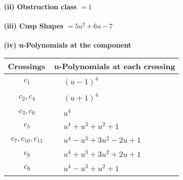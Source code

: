 \documentclass[1p]{elsarticle_modified}
\theoremstyle{definition}
\begin{document}
\flushleft \textbf{(ii) Obstruction class $= 1$}\\~\\
\flushleft \textbf{(iii) Cusp Shapes $= 5 u^2+6 u-7$}\\~\\
\newpage\renewcommand{\arraystretch}{1}
\flushleft \textbf{(iv) u-Polynomials at the component}\newline \\
\begin{tabular}{m{50pt}|m{274pt}}
Crossings & \hspace{64pt}u-Polynomials at each crossing \\
\hline $$\begin{aligned}c_{1}\end{aligned}$$&$\begin{aligned}
&(u-1)^4
\end{aligned}$\\
\hline $$\begin{aligned}c_{2},c_{4}\end{aligned}$$&$\begin{aligned}
&(u+1)^4
\end{aligned}$\\
\hline $$\begin{aligned}c_{3},c_{6}\end{aligned}$$&$\begin{aligned}
&u^4
\end{aligned}$\\
\hline $$\begin{aligned}c_{5}\end{aligned}$$&$\begin{aligned}
&u^4+u^3+u^2+1
\end{aligned}$\\
\hline $$\begin{aligned}c_{7},c_{10},c_{11}\end{aligned}$$&$\begin{aligned}
&u^4- u^3+3 u^2-2 u+1
\end{aligned}$\\
\hline $$\begin{aligned}c_{8}\end{aligned}$$&$\begin{aligned}
&u^4+u^3+3 u^2+2 u+1
\end{aligned}$\\
\hline $$\begin{aligned}c_{9}\end{aligned}$$&$\begin{aligned}
&u^4- u^3+u^2+1
\end{aligned}$\\
\hline
\end{tabular}\\~\\
\end{document}
